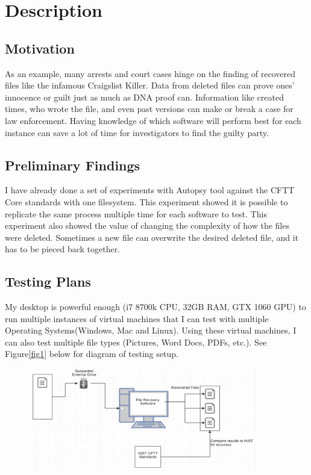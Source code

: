 \section{Description}
\subsection{Motivation}
As an example, many arrests and court cases hinge on the finding of recovered files like the infamous Craigslist 
Killer. Data from deleted files can prove ones’ innocence or guilt just as much as DNA proof can. Information 
like created times, who wrote the file, and even past versions can make or break a case for law enforcement. 
Having knowledge of which software will perform best for each instance can save a lot of time for investigators to find the guilty party.

\subsection{Preliminary Findings}
I have already done a set of experiments with Autopsy tool against the CFTT Core standards with one filesystem. 
This experiment showed it is possible to replicate the same process multiple time for each software to test. 
This experiment also showed the value of changing the complexity of how the files were deleted. 
Sometimes a new file can overwrite the desired deleted file, and it has to be pieced back together. 

\subsection{Testing Plans}
My desktop is powerful enough (i7 8700k CPU, 32GB RAM, GTX 1060 GPU) to run multiple instances of virtual machines 
that I can test with multiple Operating Systems(Windows, Mac and Linux). Using these virtual machines, I can also test multiple file types 
(Pictures, Word Docs, PDFs, etc.). See Figure\ref{fig1} below for diagram of testing setup.


\begin{figure}[t]
\includegraphics[width=10cm]{./figs/fig1.png}
\centering
\end{figure}

